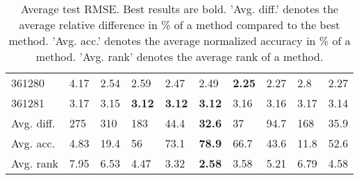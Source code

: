 \begin{table}[ht!]
\begin{tabular}{llllllllll}
  361280 & 4.17 & 2.54 & 2.59 & 2.47 & 2.49 & \textbf{2.25} & 2.27 & 2.8 & 2.27 \\ 
  361281 & 3.17 & 3.15 & \textbf{3.12} & \textbf{3.12} & \textbf{3.12} & 3.16 & 3.16 & 3.17 & 3.14 \\ 
   \hline
Avg. diff. & 275 & 310 & 183 & 44.4 & \textbf{32.6} & 37 & 94.7 & 168 & 35.9 \\ 
  Avg. acc. & 4.83 & 19.4 & 56 & 73.1 & \textbf{78.9} & 66.7 & 43.6 & 11.8 & 52.6 \\ 
  Avg. rank & 7.95 & 6.53 & 4.47 & 3.32 & \textbf{2.58} & 3.58 & 5.21 & 6.79 & 4.58 \\ 
   \hline
\hline
\end{tabular}
\endgroup
\caption{Average test RMSE. 
                  Best results are bold. 
                  'Avg. diff.' denotes the average relative difference in \% of a method compared to the best method.
                  'Avg. acc.' denotes the average normalized accuracy in \% of a method.
                  'Avg. rank' denotes the average rank of a method.} 
\label{TABLES/table_results_RMSE_clustering}
\end{table}
